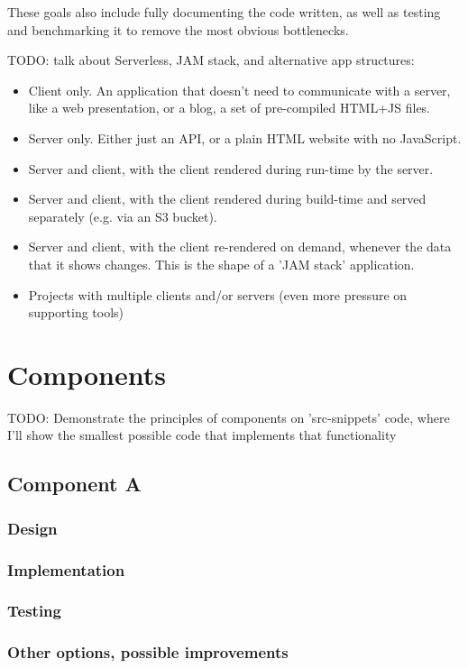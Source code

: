 \documentclass[english,odsaz]{fitthesis}
\begin{document}
These goals also include fully documenting the code written, as well as testing
and benchmarking it to remove the most obvious bottlenecks.

TODO: talk about Serverless, JAM stack, and alternative app structures:
\begin{itemize}
\item Client only. An application that doesn't need to communicate with a server,
like a web presentation, or a blog, a set of pre-compiled HTML+JS files.
\item Server only. Either just an API, or a plain HTML website with no JavaScript.
\item Server and client, with the client rendered during run-time by the server.
\item Server and client, with the client rendered during build-time and served
separately (e.g. via an S3 bucket).
\item Server and client, with the client re-rendered on demand, whenever the data that
it shows changes. This is the shape of a 'JAM stack' application.
\item Projects with multiple clients and/or servers (even more pressure on
supporting tools)
\end{itemize}

\chapter{Components}
\label{sec:orgc382420}
TODO: Demonstrate the principles of components on 'src-snippets' code, where
I'll show the smallest possible code that implements that functionality

\section{Component A}
\label{sec:org073fa74}
\subsection{Design}
\label{sec:org387b696}
\subsection{Implementation}
\label{sec:org2313038}
\subsection{Testing}
\label{sec:orgd6a30e6}
\subsection{Other options, possible improvements}
\label{sec:org100d9bd}
\end{document}
